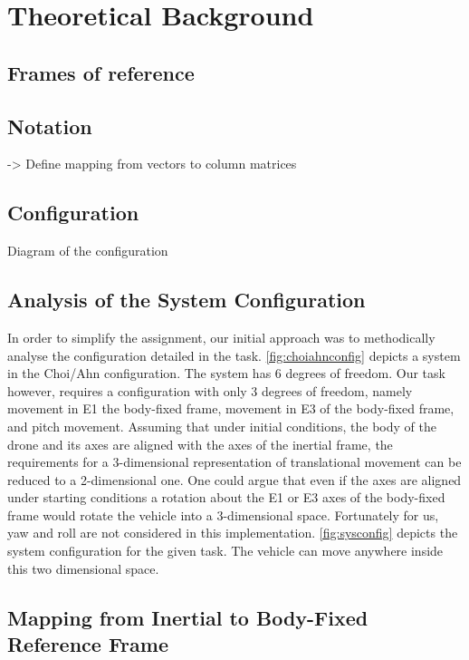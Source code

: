 \section{Theoretical Background}

\subsection{Frames of reference}

\subsection{Notation} %
-> Define mapping from vectors to column matrices
\subsection{Configuration}
Diagram of the configuration

\subsection{Analysis of the System Configuration}\label{s:analysis}
\label{fig:sysconfig}
\label{fig:choiahnconfig}
In order to simplify the assignment, our initial approach was to methodically analyse the configuration detailed in the task.
\cref{fig:choiahnconfig} depicts a system in the Choi/Ahn configuration. The system has 6 degrees of freedom. Our task however, requires a configuration with only 3 degrees of freedom, namely movement in E1 the body-fixed frame, movement in E3 of the body-fixed frame, and pitch movement.
Assuming that under initial conditions, the body of the drone and its axes are aligned with the axes of the inertial frame, the requirements for a 3-dimensional representation of translational movement can be reduced to a 2-dimensional one. One could argue that even if the axes are aligned under starting conditions a rotation about the E1 or E3 axes of the body-fixed frame would rotate the vehicle into a 3-dimensional space. Fortunately for us, yaw and roll are not considered in this implementation.
\cref{fig:sysconfig} depicts the system configuration for the given task. The vehicle can move anywhere inside this two dimensional space.

\subsection{Mapping from Inertial to Body-Fixed Reference Frame}\label{s:mapping}
